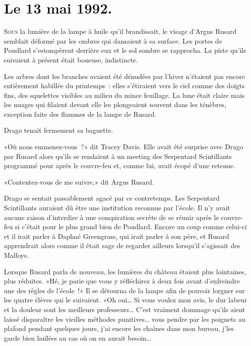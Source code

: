 
\section{Le 13 mai 1992.}

\lettrine{S}{ous} la lumière de la lampe à huile qu'il brandissait, le visage d'Argus Rusard semblait déformé par les ombres qui dansaient à sa surface. Les portes de Poudlard s'estompèrent derrière eux et le sol sombre se rapprocha. La piste qu'ils suivaient à présent était boueuse, indistincte.

Les arbres dont les branches avaient été dénudées par l'hiver n'étaient pas encore entièrement habillée du printemps~: elles s'étiraient vers le ciel comme des doigts fins, des squelettes visibles au milieu du mince feuillage. La lune était claire mais les nuages qui filaient devant elle les plongeaient souvent dans les ténèbres, exception faite des flammes de la lampe de Rusard.

Drago tenait fermement sa baguette.

«Où nous emmenez-vous~?» dit Tracey Davis. Elle avait été surprise avec Drago par Rusard alors qu'ils se rendaient à un meeting des Serpentard Scintillants programmé pour après le couvre-feu et, comme lui, avait écopé d'une retenue.

«Contentez-vous de me suivre,» dit Argus Rusard.

Drago se sentait passablement agacé par ce contretemps. Les Serpentard Scintillants auraient dû être une institution reconnue par l'école. Il n'y avait aucune raison d'interdire à une conspiration secrète de se réunir après le couvre-feu si c'était pour le plus grand bien de Poudlard. Encore un coup comme celui-ci et il irait parler à Daphné Greengrass, qui irait parler à son père, et Rusard apprendrait alors comme il était sage de regarder ailleurs lorsqu'il s'agissait des Malfoys.

Lorsque Rusard parla de nouveau, les lumières du château étaient plus lointaines, plus réduites. «Hé, je parie que vous y réfléchirez à deux fois avant d'enfreindre une des règles de l'école~!» Il se détourna de la lampe afin de pouvoir lorgner sur les quatre élèves qui le suivaient. «Oh oui… Si vous voulez mon avis, le dur labeur et la douleur sont les meilleurs professeurs… C'est vraiment dommage qu'ils aient laissé disparaître les vieilles méthodes punitives… vous pendre par les poignets au plafond pendant quelques jours, j'ai encore les chaînes dans mon bureau, j'les garde bien huilées au cas où on en aurait besoin…

